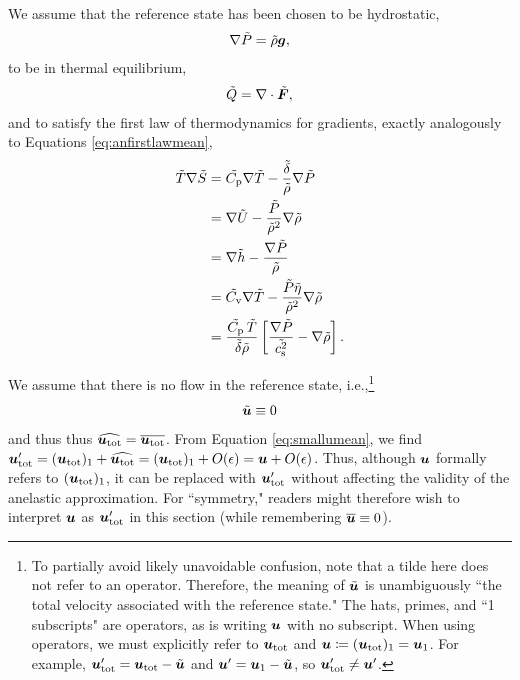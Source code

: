 \documentclass[12pt]{article}
\newcommand{\vecf}{\bm{F}}
\newcommand{\uover}{{\overline{\vecu}}}
\newcommand{\utilde}{{\tilde{\vecu}}}
\newcommand{\uprime}{{\vecu^\prime}}
\newcommand{\uone}{{\vecu}_1}
\newcommand{\utot}{{\vecu}_{\rm tot}}
\newcommand{\utotover}{\overline{{\vecu}_{\rm tot}}}
\newcommand{\utotprime}{{\vecu}_{\rm tot}^\prime}
\newcommand{\utothat}{\widehat{{\vecu}_{\rm tot}}}
\newcommand{\utotone}{({\vecu}_{\rm tot})_1}
\begin{document}
We assume that the reference state has been chosen to be hydrostatic,
\begin{align}\label{eq:refhydro}
	\nabla \tilde{P} = \tilde{\rho}\bm{g},
\end{align}
to be in thermal equilibrium,
\begin{align}\label{eq:refthermalequil}
	\heattilde = \Div\tilde{\vecf},
\end{align}
and to satisfy the first law of thermodynamics for gradients, exactly analogously to Equations \eqref{eq:anfirstlawmean},
  \begin{subequations}\label{eq:reffirstlawmean}
	\begin{align}
		\tilde{T} \nabla\tilde{S} &= \tilde{C_{\rm{p}}} \nabla\tilde{T} - \frac{\tilde{\delta}}{\tilde{\rho}} \nabla\tilde{P}\label{eq:reffirstlawmeantmpprs}\\
		&= \nabla\tilde{U} - \frac{\tilde{P}}{\tilde{\rho}^2}\nabla\tilde{\rho} \label{eq:reffirstlawmeaninterho}\\
		&= \nabla \tilde{h} - \frac{\nabla\tilde{P}}{\tilde{\rho}}\label{eq:reffirstlawmeanenthprs}\\
		&= \tilde{C_{\rm{v}}} \nabla\tilde{T} - \frac{\tilde{P}\tilde{\eta}}{\tilde{\rho}^2}\nabla\tilde{\rho}\label{eq:reffirstlawmeantmprho}\\		
		&= \frac{\tilde{C_{\rm{p}}}\, \tilde{T}}{\tilde{\delta}\tilde{\rho}}\left[\frac{\nabla\tilde{P}}{\tilde{c_{\rm s}^2}}-\nabla\tilde{\rho}\right].\label{eq:reffirstlawmeanprsrho}
	\end{align}
\end{subequations}

We assume that there is no flow in the reference state, i.e.,\footnote{To partially avoid likely unavoidable confusion, note that a tilde here does not refer to an operator. Therefore, the meaning of $\utilde$ is unambiguously ``the total velocity associated with the reference state." The hats, primes, and ``1 subscripts" are operators, as is writing $\bm{u}$ with no subscript. When using operators, we must explicitly refer to $\utot$ and $\vecu\define\utotone=\uone$. For example, $\utot^\prime=\utot-\utilde$ and $\uprime = \uone-\utilde$, so $\utot^\prime\neq\uprime$.}
\begin{align}\label{eq:norefu}
	\utilde\equiv0
\end{align}
 and thus thus $\utothat=\utotover$. From Equation \eqref{eq:smallumean}, we find $\utotprime=\utotone + \utothat = \utotone + O(\epsilon)=\vecu+O(\epsilon)$. Thus, although $\bm{u}$ formally refers to $\utotone$, it can be replaced with $\utotprime$ without affecting the validity of the anelastic approximation. For ``symmetry," readers might therefore wish to interpret $\bm{u}$ as $\utotprime$ in this section (while remembering $\uover\equiv0$).   %
\end{document}
